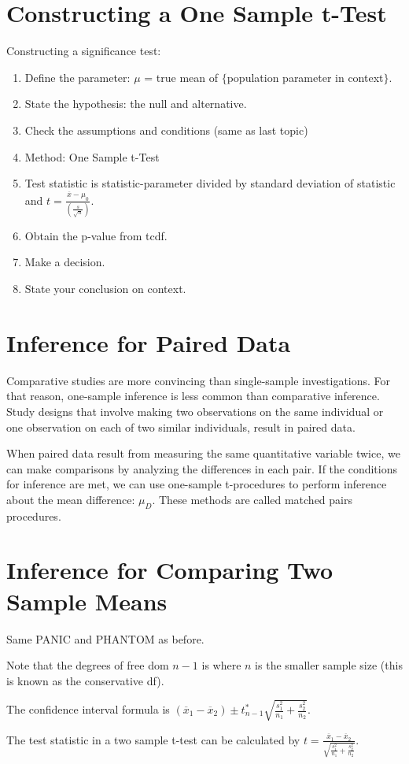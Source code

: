 \documentclass[../stats.tex]{subfiles}
\begin{document}
\section{Constructing a One Sample t-Test}
Constructing a significance test:
\begin{enumerate}
    \item Define the parameter: $\mu$ = true mean of $\{$population parameter in context$\}$.
    \item State the hypothesis: the null and alternative.
    \item Check the assumptions and conditions (same as last topic)
    \item Method: One Sample t-Test
    \item Test statistic is statistic-parameter divided by standard deviation of statistic and $t=\frac{\overline{x}-\mu_0}{\left(\frac{s}{\sqrt{n}}\right)}$.
    \item Obtain the p-value from tcdf.
    \item Make a decision.
    \item State your conclusion on context.
\end{enumerate}

\section{Inference for Paired Data}
Comparative studies are more convincing than single-sample investigations. For that reason, one-sample inference is less common than comparative inference.
Study designs that involve making two observations on the same individual or one observation on each of two similar individuals, result in paired data.

When paired data result from measuring the same quantitative variable twice, we can make comparisons by analyzing the differences in each pair. If the conditions for inference are met, we can use one-sample t-procedures to perform inference about the mean difference: $\mu_D$. These methods are called matched pairs procedures.
\section{Inference for Comparing Two Sample Means}
Same PANIC and PHANTOM as before.

Note that the degrees of free dom $n-1$ is where $n$ is the smaller sample size (this is known as the conservative df).

The confidence interval formula is $(\overline{x}_1-\overline{x}_2)\pm t^*_{n-1}\sqrt{\frac{s_1^2}{n_1}+\frac{s_2^2}{n_2}}$.

The test statistic in a two sample t-test can be calculated by $t=\frac{\overline{x}_1-\overline{x}_2}{\sqrt{\frac{s_1^2}{n_1}+\frac{s_2^2}{n_2}}}$.
\end{document}
